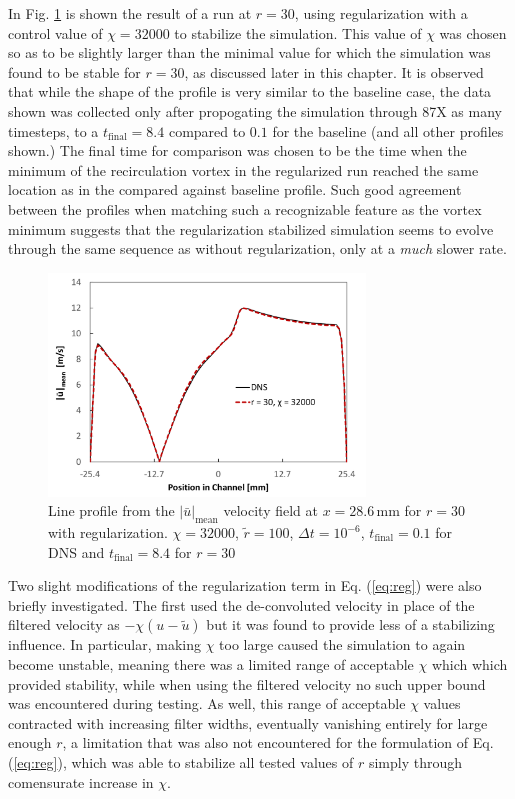 In Fig. \ref{fig:line_data_reg} is shown the result of a run at $r=30$, using regularization with a control value of $\chi=32000$ to stabilize the simulation. This value of $\chi$ was chosen so as to be slightly larger than the minimal value for which the simulation was found to be stable for $r=30$, as discussed later in this chapter. It is observed that while the shape of the profile is very similar to the baseline case, the data shown was collected only after propogating the simulation through 87X as many timesteps, to a $t_\mathrm{final}=8.4$ compared to $0.1$ for the baseline (and all other profiles shown.) The final time for comparison was chosen to be the time when the minimum of the recirculation vortex in the regularized run reached the same location as in the compared against baseline profile. Such good agreement between the profiles when matching such a recognizable feature as the vortex minimum suggests that the regularization stabilized simulation seems to evolve through the same sequence as without regularization, only at a \emph{much} slower rate.

\begin{figure}[!htb]
\centering
\includegraphics[width=0.75\textwidth]{figures/line_data_reg.pdf}
\caption{Line profile from the $|\bar{u}|_{\mathrm{mean}}$ velocity field at $x=28.6\,\mathrm{mm}$ for $r=30$ with regularization. $\chi = 32000$, $\tilde{r}=100$, $\Delta t=10^{-6}$, $t_\mathrm{final}=0.1$ for DNS and $t_\mathrm{final}=8.4$ for $r=30$}
\label{fig:line_data_reg}
\end{figure}

Two slight modifications of the regularization term in Eq. (\ref{eq:reg}) were also briefly investigated. The first used the de-convoluted velocity in place of the filtered velocity as $-\chi(u-\tilde{u})$ but it was found to provide less of a stabilizing influence. In particular, making $\chi$ too large caused the simulation to again become unstable, meaning there was a limited range of acceptable $\chi$ which which provided stability, while when using the filtered velocity no such upper bound was encountered during testing. As well, this range of acceptable $\chi$ values contracted with increasing filter widths, eventually vanishing entirely for large enough $r$, a limitation that was also not encountered for the formulation of Eq. (\ref{eq:reg}), which was able to stabilize all tested values of $r$ simply through comensurate increase in $\chi$.


